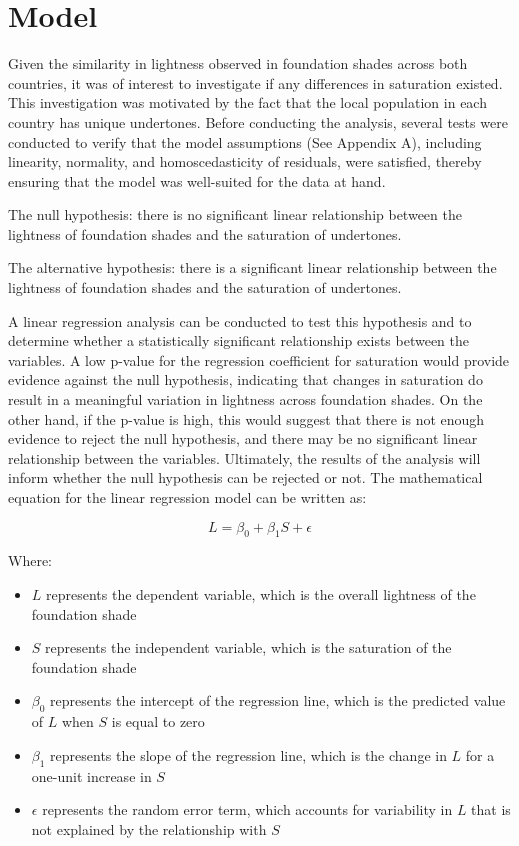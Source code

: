 \documentclass[
  letterpaper,
  DIV=11,
  numbers=noendperiod]{scrartcl}
\providecommand{\tightlist}{%
  \setlength{\itemsep}{0pt}\setlength{\parskip}{0pt}}\usepackage{longtable,booktabs,array}
\begin{document}
\newpage

\hypertarget{model}{%
\section{Model}\label{model}}

Given the similarity in lightness observed in foundation shades across
both countries, it was of interest to investigate if any differences in
saturation existed. This investigation was motivated by the fact that
the local population in each country has unique undertones. Before
conducting the analysis, several tests were conducted to verify that the
model assumptions (See Appendix A), including linearity, normality, and
homoscedasticity of residuals, were satisfied, thereby ensuring that the
model was well-suited for the data at hand.

The null hypothesis: there is no significant linear relationship between
the lightness of foundation shades and the saturation of undertones.

The alternative hypothesis: there is a significant linear relationship
between the lightness of foundation shades and the saturation of
undertones.

A linear regression analysis can be conducted to test this hypothesis
and to determine whether a statistically significant relationship exists
between the variables. A low p-value for the regression coefficient for
saturation would provide evidence against the null hypothesis,
indicating that changes in saturation do result in a meaningful
variation in lightness across foundation shades. On the other hand, if
the p-value is high, this would suggest that there is not enough
evidence to reject the null hypothesis, and there may be no significant
linear relationship between the variables. Ultimately, the results of
the analysis will inform whether the null hypothesis can be rejected or
not. The mathematical equation for the linear regression model can be
written as:

\[L = \beta_0 + \beta_1S + \epsilon\]

Where:

\begin{itemize}
\tightlist
\item
  \(L\) represents the dependent variable, which is the overall
  lightness of the foundation shade
\item
  \(S\) represents the independent variable, which is the saturation of
  the foundation shade
\item
  \(\beta_0\) represents the intercept of the regression line, which is
  the predicted value of \(L\) when \(S\) is equal to zero
\item
  \(\beta_1\) represents the slope of the regression line, which is the
  change in \(L\) for a one-unit increase in \(S\)
\item
  \(\epsilon\) represents the random error term, which accounts for
  variability in \(L\) that is not explained by the relationship with
  \(S\)
\end{itemize}
\end{document}

